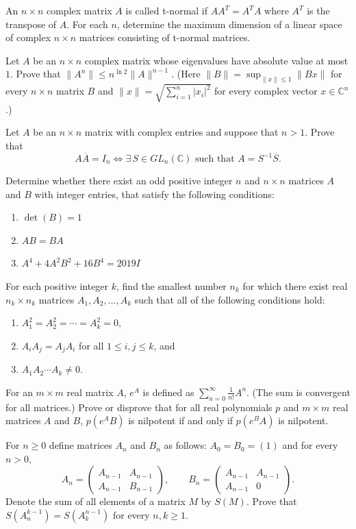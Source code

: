 \documentclass[12pt]{article}
\begin{document}
\begin{problems}
\item An $n\times n$ complex matrix $A$ is called t-normal if $AA^T=A^TA$ where $A^T$ is the transpose of $A$. For each $n$, determine the maximum dimension of a linear space of complex $n\times n$ matrices consisting of t-normal matrices.

\item Let $A$ be an $n\times n$ complex matrix whose eigenvalues have absolute value at most $1$. Prove that $\|A^n\| \le n^{\ln 2}\|A\|^{n-1}$. (Here $\|B\| = \sup_{\|x\|\le 1}\|Bx\|$ for every $n\times n$ matrix $B$ and $\|x\| = \sqrt{\sum_{i=1}^n |x_i|^2}$ for every complex vector $x\in\mathbb{C}^n$.)

\item Let $A$ be an $n\times n$ matrix with complex entries and suppose that $n>1$. Prove that
\[
A\overline{A} = I_n \iff \exists\, S\in GL_n(\mathbb{C}) \text{ such that } A = S^{-1}\overline{S}.
\]

\item Determine whether there exist an odd positive integer $n$ and $n\times n$ matrices $A$ and $B$ with integer entries, that satisfy the following conditions:
\begin{enumerate}[label=(\alph*)]
\item $\det(B)=1$
\item $AB=BA$
\item $A^4+4A^2B^2+16B^4 = 2019I$
\end{enumerate}

\item For each positive integer $k$, find the smallest number $n_k$ for which there exist real $n_k\times n_k$ matrices $A_1,A_2,\dots,A_k$ such that all of the following conditions hold:
\begin{enumerate}[label=(\arabic*)]
\item $A_1^2=A_2^2=\cdots=A_k^2=0$,
\item $A_iA_j=A_jA_i$ for all $1\le i,j\le k$, and
\item $A_1A_2\cdots A_k \ne 0$.
\end{enumerate}

\item For an $m\times m$ real matrix $A$, $e^A$ is defined as $\sum_{n=0}^\infty \frac1{n!}A^n$. (The sum is convergent for all matrices.) Prove or disprove that for all real polynomials $p$ and $m\times m$ real matrices $A$ and $B$, $p(e^AB)$ is nilpotent if and only if $p(e^BA)$ is nilpotent.

\item For $n\ge 0$ define matrices $A_n$ and $B_n$ as follows: $A_0=B_0=(1)$ and for every $n>0$,
\[
A_n = \begin{pmatrix} A_{n-1} & A_{n-1}\\ A_{n-1} & B_{n-1}\end{pmatrix}, \qquad B_n = \begin{pmatrix} A_{n-1} & A_{n-1}\\ A_{n-1} & 0\end{pmatrix}.
\]
Denote the sum of all elements of a matrix $M$ by $S(M)$. Prove that $S(A_n^{k-1}) = S(A_k^{n-1})$ for every $n,k\ge 1$.


\end{problems}
\end{document}

